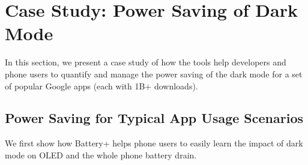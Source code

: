 \section{Case Study: Power Saving of Dark Mode}
\label{sec:casedark}



In this section, we present a case study of
how the tools help developers and phone users to quantify and manage
the power saving of the dark mode for a set of popular
Google apps
(each with 1B+ downloads).



\subsection{Power Saving for Typical App Usage Scenarios}
\label{subsec:mainresults}

We first show how Battery+ helps phone users to easily learn the
impact of dark mode on OLED and the whole phone battery drain.

